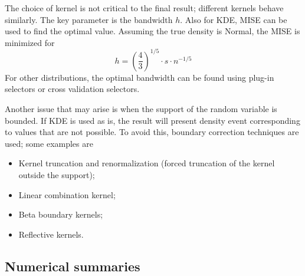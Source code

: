 The choice of kernel is not critical to the final result; different kernels behave similarly. The key parameter is the bandwidth $h$. Also for KDE, MISE can be used to find the optimal value. Assuming the true density is Normal, the MISE is minimized for
\begin{equation*}
    h = \left (\frac{4}{3} \right )^{1/5} \cdot s \cdot n^{-1/5}
\end{equation*}
For other distributions, the optimal bandwidth can be found using plug-in selectors or cross validation selectors.

Another issue that may arise is when the support of the random variable is bounded. If KDE is used as is, the result will present density event corresponding to values that are not possible. To avoid this, boundary correction techniques are used; some examples are
\begin{itemize}
    \item Kernel truncation and renormalization (forced truncation of the kernel outside the support);
    \item Linear combination kernel;
    \item Beta boundary kernels;
    \item Reflective kernels.
\end{itemize}

\subsection*{Numerical summaries}

